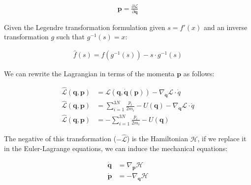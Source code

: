 \documentclass[draft]{agujournal2019}
\begin{document}
\begin{align*}
    \mathbf{p} = \frac{\partial \mathcal{L}}{\partial \mathbf{q}}
\end{align*}

Given the Legendre transformation formulation given $s = f'(x)$ and an inverse transformation $g$ such that $g^{-1}(s) = x$:

\begin{align*}
    \hat{f}(s) = f(g^{-1}(s)) - s \cdot g^{-1}(s)
\end{align*}

We can rewrite the Lagrangian in terms of the momenta $\mathbf{p}$ as follows:

\begin{align*}
    \hat{\mathcal{L}}(\mathbf{q}, \mathbf{p}) &= \mathcal{L}(\mathbf{q}, \dot{\mathbf{q}}(\mathbf{p})) - \nabla_{\dot{\mathbf{q}}} \mathcal{L} \cdot \dot{q} \\
    \hat{\mathcal{L}}(\mathbf{q}, \mathbf{p}) &= \sum_{i = 1}^{3N} \frac{p_i}{2m_i} - U(\mathbf{q}) - \nabla_{\dot{\mathbf{q}}} \mathcal{L} \cdot \dot{q} \\
    \hat{\mathcal{L}}(\mathbf{q}, \mathbf{p}) &= - \sum_{i = 1}^{3N} \frac{p_i}{2m_i} - U(\mathbf{q})
\end{align*}

The negative of this transformation ($-\hat{\mathcal{L}}$) is the Hamiltonian $\mathcal{H}$, if we replace it in the Euler-Lagrange equations, we can induce the mechanical equations:

\begin{align*}
    \dot{\mathbf{q}} &= \nabla_\mathbf{p} \mathcal{H} \\
    \dot{\mathbf{p}} &= - \nabla_\mathbf{q} \mathcal{H}
\end{align*}
\end{document}
